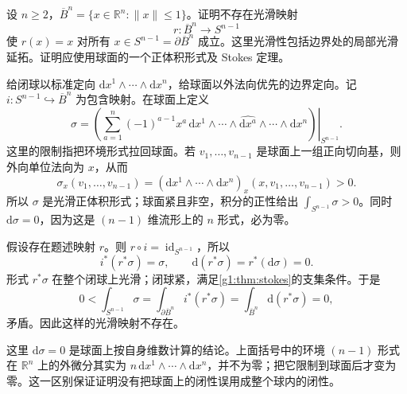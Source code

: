 \begin{exercise}\label{g1:ex:no-smooth-ball-retraction}
	设 \(n\ge2\)，\(\overline B^n=\{x\in\mathbb R^n:\lVert x\rVert\le1\}\)。证明不存在光滑映射
	\[
		r:\overline B^n\longrightarrow S^{n-1}
	\]
	使 \(r(x)=x\) 对所有 \(x\in S^{n-1}=\partial\overline B^n\) 成立。这里光滑性包括边界处的局部光滑延拓。证明应使用球面的一个正体积形式及 Stokes 定理。
\end{exercise}
\begin{solution}
	给闭球以标准定向 \(\mathrm{d}x^1\wedge\cdots\wedge\mathrm{d}x^n\)，给球面以外法向优先的边界定向。记 \(i:S^{n-1}\hookrightarrow\overline B^n\) 为包含映射。在球面上定义
	\[
		\sigma=\left.\left(\sum_{a=1}^n(-1)^{a-1}x^a\,
		\mathrm{d}x^1\wedge\cdots\wedge\widehat{\mathrm{d}x^a}\wedge\cdots\wedge\mathrm{d}x^n\right)\right|_{S^{n-1}}.
	\]
	这里的限制指把环境形式拉回球面。若 \(v_1,\ldots,v_{n-1}\) 是球面上一组正向切向基，则外向单位法向为 \(x\)，从而
	\[
		\sigma_x(v_1,\ldots,v_{n-1})
		=(\mathrm{d}x^1\wedge\cdots\wedge\mathrm{d}x^n)_x(x,v_1,\ldots,v_{n-1})>0.
	\]
	所以 \(\sigma\) 是光滑正体积形式；球面紧且非空，积分的正性给出 \(\int_{S^{n-1}}\sigma>0\)。同时 \(\mathrm{d}\sigma=0\)，因为这是 \((n-1)\) 维流形上的 \(n\) 形式，必为零。

	假设存在题述映射 \(r\)。则 \(r\circ i=\operatorname{id}_{S^{n-1}}\)，所以
	\[
		i^*(r^*\sigma)=\sigma,\qquad
		\mathrm{d}(r^*\sigma)=r^*(\mathrm{d}\sigma)=0.
	\]
	形式 \(r^*\sigma\) 在整个闭球上光滑；闭球紧，满足\cref{g1:thm:stokes}的支集条件。于是
	\[
		0<\int_{S^{n-1}}\sigma
		=\int_{\partial\overline B^n}i^*(r^*\sigma)
		=\int_{\overline B^n}\mathrm{d}(r^*\sigma)=0,
	\]
	矛盾。因此这样的光滑映射不存在。

	这里 \(\mathrm{d}\sigma=0\) 是球面上按自身维数计算的结论。上面括号中的环境 \((n-1)\) 形式在 \(\mathbb R^n\) 上的外微分其实为 \(n\,\mathrm{d}x^1\wedge\cdots\wedge\mathrm{d}x^n\)，并不为零；把它限制到球面后才变为零。这一区别保证证明没有把球面上的闭性误用成整个球内的闭性。
\end{solution}

